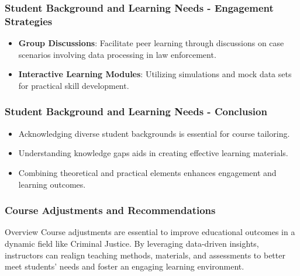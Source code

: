 \documentclass[aspectratio=169]{beamer}
\begin{document}
\begin{frame}[fragile]
    \frametitle{Student Background and Learning Needs - Engagement Strategies}
    \begin{itemize}
        \item \textbf{Group Discussions}: Facilitate peer learning through discussions on case scenarios involving data processing in law enforcement.
        \item \textbf{Interactive Learning Modules}: Utilizing simulations and mock data sets for practical skill development.
    \end{itemize}
\end{frame}

\begin{frame}[fragile]
    \frametitle{Student Background and Learning Needs - Conclusion}
    \begin{itemize}
        \item Acknowledging diverse student backgrounds is essential for course tailoring.
        \item Understanding knowledge gaps aids in creating effective learning materials.
        \item Combining theoretical and practical elements enhances engagement and learning outcomes.
    \end{itemize}
\end{frame}

\begin{frame}[fragile]
    \frametitle{Course Adjustments and Recommendations}
    \begin{block}{Overview}
        Course adjustments are essential to improve educational outcomes in a dynamic field like Criminal Justice. By leveraging data-driven insights, instructors can realign teaching methods, materials, and assessments to better meet students' needs and foster an engaging learning environment.
    \end{block}
\end{frame}
\end{document}
